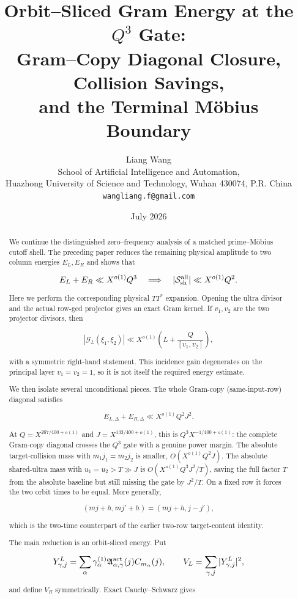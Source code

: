 \documentclass[11pt]{article}
\title{\textbf{Orbit--Sliced Gram Energy at the \(Q^3\) Gate:}\\
\textbf{Gram--Copy Diagonal Closure, Collision Savings,}\\
\textbf{and the Terminal M\"obius Boundary}}
\author{Liang Wang\\
\small School of Artificial Intelligence and Automation,\\[-0.2em]
\small Huazhong University of Science and Technology, Wuhan 430074, P.R. China\\
\small \texttt{wangliang.f@gmail.com}}
\date{July 2026}
\theoremstyle{definition}
\theoremstyle{remark}
\newcommand{\cG}{\mathcal G}
\begin{document}
\maketitle

\begin{abstract}
We continue the distinguished zero--frequency analysis of a matched
prime--M\"obius cutoff shell.  The preceding paper reduces the remaining
physical amplitude to two column energies \(E_L,E_R\) and shows that

\[
 E_L+E_R\ll X^{o(1)}Q^3
 \quad\Longrightarrow\quad
 |\mathcal S_{\rm sh}^{\rm all}|\ll X^{o(1)}Q^2.
\]

Here we perform the corresponding physical \(TT^*\) expansion.  Opening
the ultra divisor and the actual row-gcd projector gives an exact Gram
kernel.  If \(v_1,v_2\) are the two projector divisors, then

\[
 |\cG_L(\xi_1,\xi_2)|
 \ll X^{o(1)}\left(L+\frac{Q}{[v_1,v_2]}\right),
\]

with a symmetric right-hand statement.  This incidence gain degenerates
on the principal layer \(v_1=v_2=1\), so it is not itself the required
energy estimate.

We then isolate several unconditional pieces.  The whole Gram-copy
(same-input-row) diagonal satisfies

\[
 E_{L,\Delta}+E_{R,\Delta}\ll X^{o(1)}Q^2J^2.
\]

At \(Q=X^{267/400+o(1)}\) and \(J=X^{133/400+o(1)}\), this is
\(Q^3X^{-1/400+o(1)}\): the complete Gram-copy diagonal crosses the \(Q^3\)
gate with a genuine power margin.  The absolute target-collision mass
with \(m_1j_1=m_2j_2\) is smaller, \(O(X^{o(1)}Q^2J)\).  The absolute
shared-ultra mass with \(u_1=u_2>T\gg J\) is
\(O(X^{o(1)}Q^3J^2/T)\), saving the full factor \(T\) from the
absolute baseline but still missing the gate by \(J^2/T\).  On a fixed
row it forces the two orbit times to be equal.  More generally,

\[
 (mj+h,mj'+h)=(mj+h,j-j'),
\]

which is the two-time counterpart of the earlier two-row target-content
identity.

The main reduction is an orbit-sliced energy.  Put

\[
 Y^L_{\gamma,j}
 =\sum_\alpha\gamma_\alpha^{(1)}
   \mathfrak A_{\alpha,\gamma}^{\rm act}(j)C_{m_\alpha}(j),
 \qquad
 V_L=\sum_{\gamma,j}|Y^L_{\gamma,j}|^2,
\]

and define \(V_R\) symmetrically.  Exact Cauchy--Schwarz gives


\end{abstract}
\end{document}
